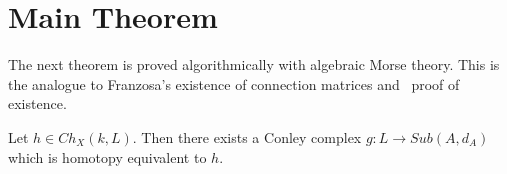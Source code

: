 
\section{Main Theorem}\label{sec:thm}



The next theorem is proved algorithmically with algebraic Morse theory.  This is the analogue to Franzosa's existence of connection matrices and~\cite{salamon} proof of existence.


\begin{thm}\label{thm:exist}
Let $h\in Ch_X(k,L)$.  Then there exists a Conley complex $g:L\to Sub(A,d_A)$ which is homotopy equivalent to $h$.
\end{thm}
%









